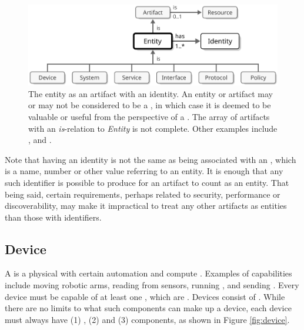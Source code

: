 \vfill

\begin{figure}[ht!]
  \centering
  \includegraphics[scale=0.9]{figures/entity}
  \caption{
    The entity as an artifact with an identity.
    An entity or artifact may or may not be considered to be a , in which case it is deemed to be valuable or useful from the perspective of a .
    The array of artifacts with an \textit{is}-relation to \textit{Entity} is not complete.
    Other examples include ,  and .
  }
  \label{fig:entity}
\end{figure}

Note that having an identity is not the same as being associated with an , which is a name, number or other value referring to an entity.
It is enough that any such identifier is possible to produce for an artifact to count as an entity.
That being said, certain  requirements, perhaps related to security, performance or discoverability, may make it impractical to treat any other artifacts as entities than those with identifiers.

\subsection{Device}
\label{sec:concepts:device}

A  is a physical  with certain automation and compute .
Examples of capabilities include moving robotic arms, reading from sensors, running , and sending .
Every device must be capable of  at least one , which are  .
Devices consist of .
While there are no limits to what such components can make up a device, each device must always have (1) , (2)  and (3)  components, as shown in Figure \ref{fig:device}.

